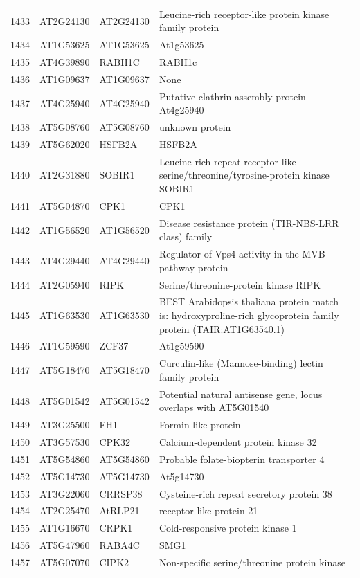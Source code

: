 \documentclass[11pt]{article}
\begin{document}
\begin{center}
\begin{tabular}{rlll}
1433 & AT2G24130 & AT2G24130 & Leucine-rich receptor-like protein kinase family protein\\
1434 & AT1G53625 & AT1G53625 & At1g53625\\
1435 & AT4G39890 & RABH1C & RABH1c\\
1436 & AT1G09637 & AT1G09637 & None\\
1437 & AT4G25940 & AT4G25940 & Putative clathrin assembly protein At4g25940\\
1438 & AT5G08760 & AT5G08760 & unknown protein\\
1439 & AT5G62020 & HSFB2A & HSFB2A\\
1440 & AT2G31880 & SOBIR1 & Leucine-rich repeat receptor-like serine/threonine/tyrosine-protein kinase SOBIR1\\
1441 & AT5G04870 & CPK1 & CPK1\\
1442 & AT1G56520 & AT1G56520 & Disease resistance protein (TIR-NBS-LRR class) family\\
1443 & AT4G29440 & AT4G29440 & Regulator of Vps4 activity in the MVB pathway protein\\
1444 & AT2G05940 & RIPK & Serine/threonine-protein kinase RIPK\\
1445 & AT1G63530 & AT1G63530 & BEST Arabidopsis thaliana protein match is: hydroxyproline-rich glycoprotein family protein (TAIR:AT1G63540.1)\\
1446 & AT1G59590 & ZCF37 & At1g59590\\
1447 & AT5G18470 & AT5G18470 & Curculin-like (Mannose-binding) lectin family protein\\
1448 & AT5G01542 & AT5G01542 & Potential natural antisense gene, locus overlaps with AT5G01540\\
1449 & AT3G25500 & FH1 & Formin-like protein\\
1450 & AT3G57530 & CPK32 & Calcium-dependent protein kinase 32\\
1451 & AT5G54860 & AT5G54860 & Probable folate-biopterin transporter 4\\
1452 & AT5G14730 & AT5G14730 & At5g14730\\
1453 & AT3G22060 & CRRSP38 & Cysteine-rich repeat secretory protein 38\\
1454 & AT2G25470 & AtRLP21 & receptor like protein 21\\
1455 & AT1G16670 & CRPK1 & Cold-responsive protein kinase 1\\
1456 & AT5G47960 & RABA4C & SMG1\\
1457 & AT5G07070 & CIPK2 & Non-specific serine/threonine protein kinase\\

\end{tabular}
\end{center}
\end{document}

